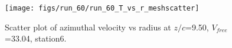 \begin{figure}[H]
\centering
\texttt{[image: figs/run\_60/run\_60\_T\_vs\_r\_meshscatter]}
\caption{Scatter plot of azimuthal velocity vs radius at $z/c$=9.50, $V_{free}$=33.04, station6.}
\label{fig:run_60_T_vs_r_meshscatter}
\end{figure}


